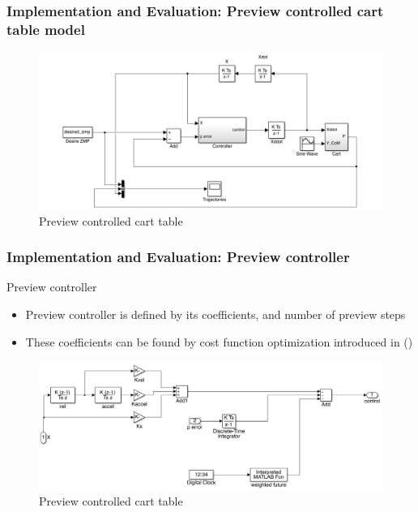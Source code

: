 \documentclass{beamer}
\begin{document}

	\begin{frame}
		\frametitle{Implementation and Evaluation: Preview controlled cart table model}
		\begin{figure}[h!]
			\centering
			\includegraphics[width=\linewidth]{presentation_images/22}
			\caption{Preview controlled cart table}
		\end{figure}
	\end{frame}
	

	\begin{frame}
		\frametitle{Implementation and Evaluation: Preview controller}
		\begin{block}{Preview controller}
			\begin{itemize}
				\item
					Preview controller is defined by its coefficients, and number of preview steps
				\item
					These coefficients can be found by cost function optimization introduced in (\cite{katayama1985design})
			\end{itemize}
		\end{block}
		
		\begin{figure}[h!]
			\centering
			\includegraphics[width=0.8\linewidth]{presentation_images/23}
			\caption{Preview controlled cart table}
		\end{figure}
	\end{frame}
	
\end{document}
